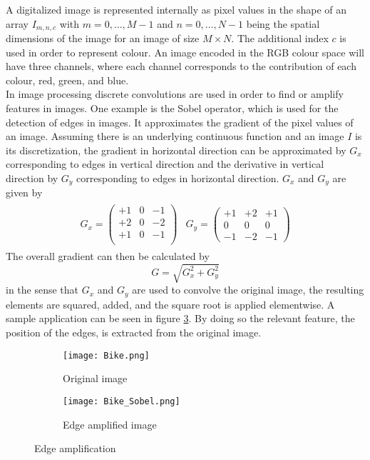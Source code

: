 A digitalized image is represented internally as pixel values in the shape of an array $I_{m,n,c}$ with $m=0,\dots ,M-1$ and $n=0,\dots ,N-1$ being the spatial dimensions of the image for an image of size $M\times N$. The additional index $c$ is used in order to represent colour. An image encoded in the RGB colour space will have three channels, where each channel corresponds to the contribution of each colour, red, green, and blue. \\

In image processing discrete convolutions are used in order to find or amplify features in images. One example is the Sobel operator, which is used for the detection of edges in images. It approximates the gradient of the pixel values of an image. Assuming there is an underlying continuous function and an image $I$ is its discretization, the gradient in horizontal direction can be approximated by $G_x$ corresponding to edges in vertical direction and the derivative in vertical direction by $G_y$ corresponding to edges in horizontal direction. $G_x$ and $G_y$ are given by
\begin{align}
  \begin{split}
G_x =
\begin{pmatrix}
+1 & 0 & -1 \\
+2 & 0 & -2 \\
+1 & 0 & -1 \\
\end{pmatrix}
\end{split}
\begin{split}
G_y = 
\begin{pmatrix}
+1 & +2 & +1 \\
0 & 0 & 0 \\
-1 & -2 & -1
\end{pmatrix}
\end{split}
\end{align}
The overall gradient can then be calculated by
\begin{equation}
G = \sqrt{G_x^2+G_y^2}
\end{equation}
in the sense that $G_x$ and $G_y$ are used to convolve the original image, the resulting elements are squared, added, and the square root is applied elementwise. A sample application can be seen in figure \ref{fig:Sobel}. By doing so the relevant feature, the position of the edges, is extracted from the original image. \\
\begin{figure}
\centering
\begin{subfigure}{.5\textwidth}
  \centering
  \texttt{[image: Bike.png]}
  \caption{Original image}
  \label{fig:sub1}
\end{subfigure}%
\begin{subfigure}{.5\textwidth}
  \centering
  \texttt{[image: Bike\_Sobel.png]}
  \caption{Edge amplified image}
  \label{fig:sub2}
\end{subfigure}
\caption{Edge amplification}
\label{fig:Sobel}
\end{figure}

